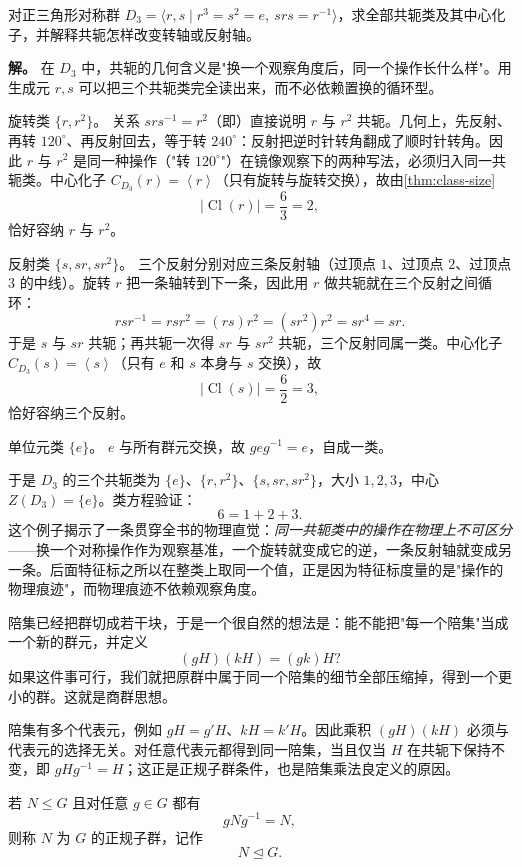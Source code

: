 \begin{example}[{$D_3$ 共轭类的几何解读}]
对正三角形对称群 $D_3=\langle r,s\mid r^3=s^2=e,\ srs=r^{-1}\rangle$，求全部共轭类及其中心化子，并解释共轭怎样改变转轴或反射轴。

\textbf{解。} 在 $D_3$ 中，共轭的几何含义是"换一个观察角度后，同一个操作长什么样"。用生成元 $r,s$ 可以把三个共轭类完全读出来，而不必依赖置换的循环型。

旋转类 $\{r,r^2\}$。
关系 $srs^{-1}=r^2$（即）直接说明 $r$ 与 $r^2$ 共轭。几何上，先反射、再转 $120^\circ$、再反射回去，等于转 $240^\circ$：反射把逆时针转角翻成了顺时针转角。因此 $r$ 与 $r^2$ 是同一种操作（"转 $120^\circ$"）在镜像观察下的两种写法，必须归入同一共轭类。中心化子 $C_{D_3}(r)=\left\langle r\right\rangle$（只有旋转与旋转交换），故由\cref{thm:class-size}
\[
\lvert\operatorname{Cl}(r)\rvert=\frac{6}{3}=2,
\]
恰好容纳 $r$ 与 $r^2$。

反射类 $\{s,sr,sr^2\}$。
三个反射分别对应三条反射轴（过顶点 $1$、过顶点 $2$、过顶点 $3$ 的中线）。旋转 $r$ 把一条轴转到下一条，因此用 $r$ 做共轭就在三个反射之间循环：
\[
rsr^{-1}=r s r^2=(r s)r^2=(sr^2)r^2=sr^4=sr.
\]
于是 $s$ 与 $sr$ 共轭；再共轭一次得 $sr$ 与 $sr^2$ 共轭，三个反射同属一类。中心化子 $C_{D_3}(s)=\left\langle s\right\rangle$（只有 $e$ 和 $s$ 本身与 $s$ 交换），故
\[
\lvert\operatorname{Cl}(s)\rvert=\frac{6}{2}=3,
\]
恰好容纳三个反射。

单位元类 $\{e\}$。
$e$ 与所有群元交换，故 $geg^{-1}=e$，自成一类。

于是 $D_3$ 的三个共轭类为 $\{e\}$、$\{r,r^2\}$、$\{s,sr,sr^2\}$，大小 $1,2,3$，中心 $Z(D_3)=\{e\}$。类方程验证：
\[
6=1+2+3.
\]
这个例子揭示了一条贯穿全书的物理直觉：\emph{同一共轭类中的操作在物理上不可区分}——换一个对称操作作为观察基准，一个旋转就变成它的逆，一条反射轴就变成另一条。后面特征标之所以在整类上取同一个值，正是因为特征标度量的是"操作的物理痕迹"，而物理痕迹不依赖观察角度。
\end{example}

陪集已经把群切成若干块，于是一个很自然的想法是：能不能把"每一个陪集"当成一个新的群元，并定义
\[
(gH)(kH)=(gk)H?
\]
如果这件事可行，我们就把原群中属于同一个陪集的细节全部压缩掉，得到一个更小的群。这就是商群思想。

陪集有多个代表元，例如 $gH=g'H$、$kH=k'H$。因此乘积 $(gH)(kH)$ 必须与代表元的选择无关。对任意代表元都得到同一陪集，当且仅当 $H$ 在共轭下保持不变，即 $gHg^{-1}=H$；这正是正规子群条件，也是陪集乘法良定义的原因。

\begin{definition}[正规子群]
若 $N\leqslant G$ 且对任意 $g\in G$ 都有
\[
gNg^{-1}=N,
\]
则称 $N$ 为 $G$ 的正规子群，记作
\[
N\mathrel{\trianglelefteq} G.
\]
\label{def:normal-subgroup}
\end{definition}


